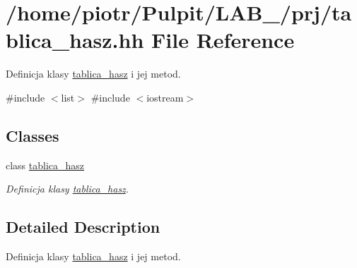 \hypertarget{tablica__hasz_8hh}{\section{/home/piotr/\-Pulpit/\-L\-A\-B\-\_/prj/tablica\-\_\-hasz.hh \-File \-Reference}
\label{tablica__hasz_8hh}
}


\-Definicja klasy \hyperlink{classtablica__hasz}{tablica\-\_\-hasz} i jej metod.  


{\ttfamily \#include $<$list$>$}\*
{\ttfamily \#include $<$iostream$>$}\*
\subsection*{\-Classes}
\begin{DoxyCompactItemize}
\item 
class \hyperlink{classtablica__hasz}{tablica\-\_\-hasz}
\begin{DoxyCompactList}\small\item\em \-Definicja klasy \hyperlink{classtablica__hasz}{tablica\-\_\-hasz}. \end{DoxyCompactList}\end{DoxyCompactItemize}


\subsection{\-Detailed \-Description}
\-Definicja klasy \hyperlink{classtablica__hasz}{tablica\-\_\-hasz} i jej metod. 